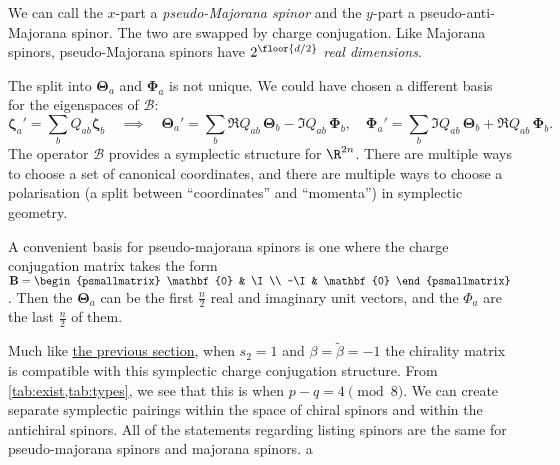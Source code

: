 \documentclass[11pt]{article}
\newcommand{\B}{\mathbf{B}}
\newcommand{\Thetab}{\boldsymbol{\Theta}}
\newcommand{\Phib}{\boldsymbol{\Phi}}
\newcommand{\zetab}{\boldsymbol{\zeta}}
\newcommand{\betat}{\tilde{\beta}}
\begin{document}
We can call the \(x\)-part a \emph{pseudo-Majorana spinor} and the \(y\)-part a pseudo-anti-Majorana spinor.
The two are swapped by charge conjugation.
Like Majorana spinors, pseudo-Majorana spinors have \(2^{\floor{d/2}}\) \emph{real dimensions}.

The split into \(\Thetab_a\) and \(\Phib_a\) is not unique.
We could have chosen a different basis for the eigenspaces of \(\mathcal{B}\):
%
\begin{equation*}
  \zetab_a' = \sum_b Q_{ab} \zetab_b
  \quad \implies \quad
  \Thetab_a' = \sum_b \Re Q_{ab}\, \Thetab_b - \Im Q_{ab}\, \Phib_b,
  \quad
  \Phib_a'   = \sum_b \Im Q_{ab}\, \Thetab_b + \Re Q_{ab}\, \Phib_b.
\end{equation*}
%
The operator \(\mathcal{B}\) provides a symplectic structure for \(\R^{2n}\).
There are multiple ways to choose a set of canonical coordinates, and there are multiple ways to choose a polarisation (a split between ``coordinates'' and ``momenta'') in symplectic geometry.

A convenient basis for pseudo-majorana spinors is one where the charge conjugation matrix takes the form 
\( \B = \begin{psmallmatrix}
          \mathbf{0} & \I \\
          -\I & \mathbf{0}
        \end{psmallmatrix}\).
Then the \(\Thetab_a\) can be the first \(\frac{n}{2}\) real and imaginary unit vectors, and the \(\Phi_a\) are the last \(\frac{n}{2}\) of them.

Much like \hyperref[sec:majorana]{the previous section}, when \(s_2 = 1\) and \(\beta = \betat = -1\) the chirality matrix is compatible with this symplectic charge conjugation structure.
From \cref{tab:exist,tab:types}, we see that this is when \( p-q = 4 \pmod 8 \).
We can create separate symplectic pairings within the space of chiral spinors and within the antichiral spinors.
All of the statements regarding listing spinors are the same for pseudo-majorana spinors and majorana spinors.
a
\end{document}
